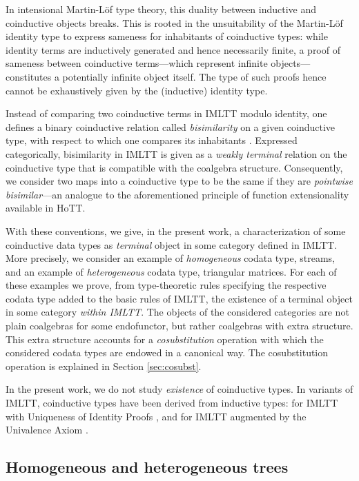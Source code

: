 \documentclass[a4paper,USenglish]{lipics}
\newcommand{\parencite}[1]{\cite{#1}}
\begin{document}
 In intensional Martin-Löf type theory, this duality between inductive and coinductive objects breaks. This is rooted in the 
 unsuitability of the Martin-Löf identity type to express sameness for inhabitants of coinductive types:
 while identity terms are inductively generated and hence necessarily finite, 
 a proof of sameness between coinductive terms---which represent infinite objects---constitutes a potentially infinite object itself.
 The type of such proofs hence cannot be exhaustively given by the (inductive) identity type.
 
 Instead of comparing two coinductive terms in IMLTT modulo identity, one defines a 
 binary coinductive relation called \emph{bisimilarity} on a given coinductive type, with respect to which one compares its inhabitants  \parencite{DBLP:conf/types/Coquand93}. 
 Expressed categorically, bisimilarity in IMLTT is given as a \emph{weakly terminal} relation on the coinductive type that is compatible with the coalgebra structure.
 Consequently, we consider two maps into a coinductive type to be the same if they are \emph{pointwise bisimilar}---an analogue
 to the aforementioned principle of function extensionality available in HoTT. 
 
 With these conventions, we give, in the present work, a characterization of some coinductive data types as \emph{terminal} object in some category 
 defined in IMLTT.
 More precisely, we consider an example of \emph{homogeneous} codata type, streams, and 
 an example of \emph{heterogeneous} codata type, triangular matrices.
 For each of these examples we prove, 
 from type-theoretic rules specifying the respective codata type added to the basic rules of IMLTT,
 the existence of a terminal object in some category \emph{within IMLTT}.
 The objects of the considered categories are not plain coalgebras for some endofunctor, but rather coalgebras with extra structure.
 This extra structure accounts for a \emph{cosubstitution} operation with which the considered codata types are endowed in a canonical way.
 The cosubstitution operation is explained in Section \ref{sec:cosubst}.

 In the present work, we do not study \emph{existence} of coinductive types. 
 In variants of IMLTT, coinductive types have been derived from inductive types: 
 for IMLTT with Uniqueness of Identity Proofs \cite{indexed_containers}, and for IMLTT augmented by the Univalence Axiom \cite{ahrens_capriotti_spadotti}.

\subsection{Homogeneous and heterogeneous trees}\label{sec:hom_het}
\end{document}
